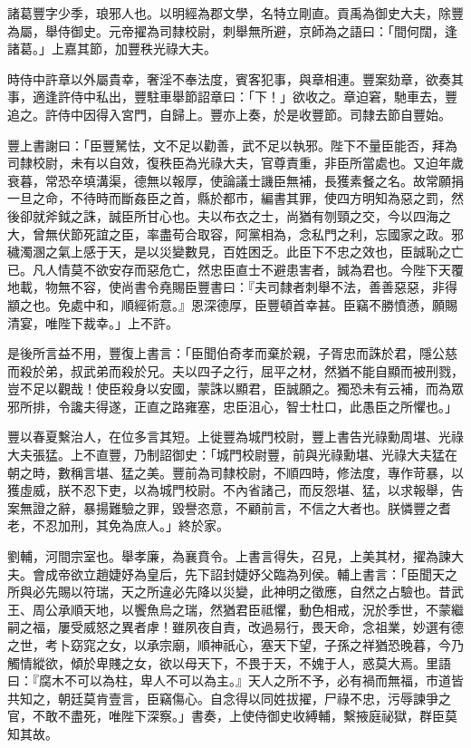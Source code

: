 \begin{pinyinscope}
諸葛豐字少季，琅邪人也。以明經為郡文學，名特立剛直。貢禹為御史大夫，除豐為屬，舉侍御史。元帝擢為司隸校尉，刺舉無所避，京師為之語曰：「間何闊，逢諸葛。」上嘉其節，加豐秩光祿大夫。

時侍中許章以外屬貴幸，奢淫不奉法度，賓客犯事，與章相連。豐案劾章，欲奏其事，適逢許侍中私出，豐駐車舉節詔章曰：「下！」欲收之。章迫窘，馳車去，豐追之。許侍中因得入宮門，自歸上。豐亦上奏，於是收豐節。司隸去節自豐始。

豐上書謝曰：「臣豐駑怯，文不足以勸善，武不足以執邪。陛下不量臣能否，拜為司隸校尉，未有以自效，復秩臣為光祿大夫，官尊責重，非臣所當處也。又迫年歲衰暮，常恐卒填溝渠，德無以報厚，使論議士譏臣無補，長獲素餐之名。故常願捐一旦之命，不待時而斷姦臣之首，縣於都市，編書其罪，使四方明知為惡之罰，然後卻就斧鉞之誅，誠臣所甘心也。夫以布衣之士，尚猶有刎頸之交，今以四海之大，曾無伏節死誼之臣，率盡苟合取容，阿黨相為，念私門之利，忘國家之政。邪穢濁溷之氣上感于天，是以災變數見，百姓困乏。此臣下不忠之效也，臣誠恥之亡已。凡人情莫不欲安存而惡危亡，然忠臣直士不避患害者，誠為君也。今陛下天覆地載，物無不容，使尚書令堯賜臣豐書曰：『夫司隸者刺舉不法，善善惡惡，非得顓之也。免處中和，順經術意。』恩深德厚，臣豐頓首幸甚。臣竊不勝憤懣，願賜清宴，唯陛下裁幸。」上不許。

是後所言益不用，豐復上書言：「臣聞伯奇孝而棄於親，子胥忠而誅於君，隱公慈而殺於弟，叔武弟而殺於兄。夫以四子之行，屈平之材，然猶不能自顯而被刑戮，豈不足以觀哉！使臣殺身以安國，蒙誅以顯君，臣誠願之。獨恐未有云補，而為眾邪所排，令讒夫得遂，正直之路雍塞，忠臣沮心，智士杜口，此愚臣之所懼也。」

豐以春夏繫治人，在位多言其短。上徙豐為城門校尉，豐上書告光祿勳周堪、光祿大夫張猛。上不直豐，乃制詔御史：「城門校尉豐，前與光祿勳堪、光祿大夫猛在朝之時，數稱言堪、猛之美。豐前為司隸校尉，不順四時，修法度，專作苛暴，以獲虛威，朕不忍下吏，以為城門校尉。不內省諸己，而反怨堪、猛，以求報舉，告案無證之辭，暴揚難驗之罪，毀譽恣意，不顧前言，不信之大者也。朕憐豐之耆老，不忍加刑，其免為庶人。」終於家。

劉輔，河間宗室也。舉孝廉，為襄賁令。上書言得失，召見，上美其材，擢為諫大夫。會成帝欲立趙婕妤為皇后，先下詔封婕妤父臨為列侯。輔上書言：「臣聞天之所與必先賜以符瑞，天之所違必先降以災變，此神明之徵應，自然之占驗也。昔武王、周公承順天地，以饗魚烏之瑞，然猶君臣祗懼，動色相戒，況於季世，不蒙繼嗣之福，屢受威怒之異者虖！雖夙夜自責，改過易行，畏天命，念祖業，妙選有德之世，考卜窈窕之女，以承宗廟，順神祇心，塞天下望，子孫之祥猶恐晚暮，今乃觸情縱欲，傾於卑賤之女，欲以母天下，不畏于天，不媿于人，惑莫大焉。里語曰：『腐木不可以為柱，卑人不可以為主。』天人之所不予，必有禍而無福，市道皆共知之，朝廷莫肯壹言，臣竊傷心。自念得以同姓拔擢，尸祿不忠，污辱諫爭之官，不敢不盡死，唯陛下深察。」書奏，上使侍御史收縛輔，繫掖庭祕獄，群臣莫知其故。


\end{pinyinscope}
